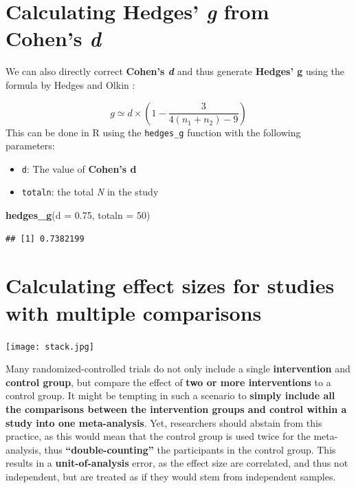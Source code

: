 \documentclass[]{book}
\newenvironment{Shaded}{\begin{snugshade}}{\end{snugshade}}
\newcommand{\DataTypeTok}[1]{\textcolor[rgb]{0.13,0.29,0.53}{#1}}
\newcommand{\DecValTok}[1]{\textcolor[rgb]{0.00,0.00,0.81}{#1}}
\newcommand{\FloatTok}[1]{\textcolor[rgb]{0.00,0.00,0.81}{#1}}
\newcommand{\KeywordTok}[1]{\textcolor[rgb]{0.13,0.29,0.53}{\textbf{#1}}}
\newcommand{\NormalTok}[1]{#1}
\providecommand{\tightlist}{%
  \setlength{\itemsep}{0pt}\setlength{\parskip}{0pt}}
\begin{document}
\hypertarget{h}{%
\section{\texorpdfstring{Calculating Hedges' \emph{g} from Cohen's \emph{d}}{Calculating Hedges' g from Cohen's d}}\label{h}}

We can also directly correct \textbf{Cohen's \emph{d} } and thus generate \textbf{Hedges' g} using the formula by Hedges and Olkin \citep{hedges1985statistical}:

\[g \simeq d\times(1-\frac{3}{4(n_1+n_2)-9}) \]
This can be done in R using the \texttt{hedges\_g} function with the following parameters:

\begin{itemize}
\tightlist
\item
  \texttt{d}: The value of \textbf{Cohen's d}
\item
  \texttt{totaln}: the total \emph{N} in the study
\end{itemize}

\begin{Shaded}
\begin{Highlighting}[]
\KeywordTok{hedges_g}\NormalTok{(}\DataTypeTok{d =} \FloatTok{0.75}\NormalTok{, }\DataTypeTok{totaln =} \DecValTok{50}\NormalTok{)}
\end{Highlighting}
\end{Shaded}

\begin{verbatim}
## [1] 0.7382199
\end{verbatim}

\hypertarget{i}{%
\section{Calculating effect sizes for studies with multiple comparisons}\label{i}}

\texttt{[image: stack.jpg]}

Many randomized-controlled trials do not only include a single \textbf{intervention} and \textbf{control group}, but compare the effect of \textbf{two or more interventions} to a control group. It might be tempting in such a scenario to \textbf{simply include all the comparisons between the intervention groups and control within a study into one meta-analysis}. Yet, researchers should abstain from this practice, as this would mean that the control group is used twice for the meta-analysis, thus \textbf{``double-counting''} the participants in the control group. This results in a \textbf{unit-of-analysis} error, as the effect size are correlated, and thus not independent, but are treated as if they would stem from independent samples.
\end{document}
